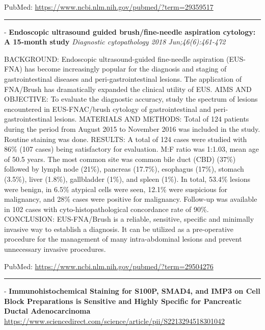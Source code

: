 \documentclass[]{article}
\begin{document}
PubMed: \url{https://www.ncbi.nlm.nih.gov/pubmed/?term=29359517}

{}

{}

\begin{center}\rule{0.5\linewidth}{\linethickness}\end{center}

 - \textbf{Endoscopic ultrasound guided brush/fine-needle aspiration
cytology: A 15-month study} \emph{Diagnostic cytopathology 2018
Jun;46(6):461-472}

BACKGROUND: Endoscopic ultrasound-guided fine-needle aspiration
(EUS-FNA) has become increasingly popular for the diagnosis and staging
of gastrointestinal diseases and peri-gastrointestinal lesions. The
application of FNA/Brush has dramatically expanded the clinical utility
of EUS. AIMS AND OBJECTIVE: To evaluate the diagnostic accuracy, study
the spectrum of lesions encountered in EUS-FNAC/brush cytology of
gastrointestinal and peri-gastrointestinal lesions. MATERIALS AND
METHODS: Total of 124 patients during the period from August 2015 to
November 2016 was included in the study. Routine staining was done.
RESULTS: A total of 124 cases were studied with 86\% (107 cases) being
satisfactory for evaluation. M:F ratio was 1:1.03, mean age of 50.5
years. The most common site was common bile duct (CBD) (37\%) followed
by lymph node (21\%), pancreas (17.7\%), esophagus (17\%), stomach
(3.5\%), liver (1.8\%), gallbladder (1\%), and spleen (1\%). In total,
53.4\% lesions were benign, in 6.5\% atypical cells were seen, 12.1\%
were suspicious for malignancy, and 28\% cases were positive for
malignancy. Follow-up was available in 102 cases with
cyto-histopathological concordance rate of 90\%. CONCLUSION:
EUS-FNA/Brush is a reliable, sensitive, specific and minimally invasive
way to establish a diagnosis. It can be utilized as a pre-operative
procedure for the management of many intra-abdominal lesions and prevent
unnecessary invasive procedures.

PubMed: \url{https://www.ncbi.nlm.nih.gov/pubmed/?term=29504276}

{}

{}

\begin{center}\rule{0.5\linewidth}{\linethickness}\end{center}

 - \textbf{Immunohistochemical Staining for S100P, SMAD4, and IMP3 on
Cell Block Preparations is Sensitive and Highly Specific for Pancreatic
Ductal Adenocarcinoma}
\url{https://www.sciencedirect.com/science/article/pii/S2213294518301042}
\end{document}
